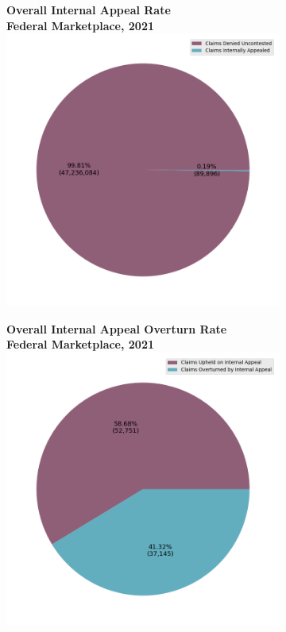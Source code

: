 \documentclass[12pt, a4paper,twoside,parskip=full]{report}
\theoremstyle{plain} %
\theoremstyle{definition} %
\theoremstyle{remark} %
\numberwithin{equation}{chapter}
\begin{document}
	\begin{figure}[h!]
		\centering
		\begin{subfigure}[b]{0.49\textwidth}
			\centering
			\textbf{Overall Internal Appeal Rate}\\
			\textbf{Federal Marketplace, 2021}\\
			\includegraphics[width=\textwidth]{images/cms_puf/internal_appeal_rates_all_insurers.png}
		\end{subfigure}
		\hfill
		\begin{subfigure}[b]{0.49\textwidth}
			\centering
			\textbf{Overall Internal Appeal Overturn Rate}\\
			\textbf{Federal Marketplace, 2021}\\
			\includegraphics[width=\textwidth]{images/cms_puf/internal_appeal_success_rates_all_insurers.png}

\end{subfigure}
\end{figure}
\end{document}
